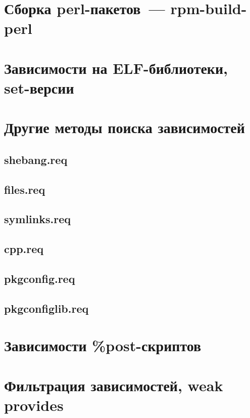 \documentclass[russian,a4paper,12pt,titlepage]{article}
\begin{document}
\section{Сборка perl-пакетов~--- rpm-build-perl}

\label{perl-macros}

\section{Зависимости на ELF-библиотеки, set-версии}

\label{set-versions}

\section{Другие методы поиска зависимостей}

\subsection{shebang.req}
\label{shebang-req}

\subsection{files.req}

\subsection{symlinks.req}
\label{symlinks-req}

\subsection{cpp.req}
\subsection{pkgconfig.req}
\subsection{pkgconfiglib.req}

\section{Зависимости \%post-скриптов}

\label{post-script-deps}

\section{Фильтрация зависимостей, weak provides}
\label{filter-deps}
\end{document}
